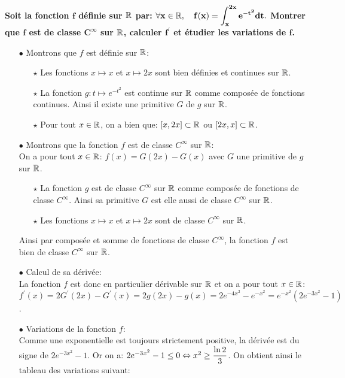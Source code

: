 \documentclass[a4paper, 11pt,reqno]{article}
\begin{document}
\begin{correction}  \;
	\textbf{Soit la fonction $\mathbf{f}$ d\'efinie sur $\mathbf{\mathbb{R}}$ par: $\mathbf{ \displaystyle \forall x\in\mathbb{R},\quad f(x)=\int_x^{2x} e^{-t^2}dt.}$
		Montrer que $\mathbf{f}$ est de classe $\mathbf{C^{\infty}}$ sur $\mathbf{\mathbb{R}}$, calculer $\mathbf{f^{\prime}}$ et \'etudier les variations de $\mathbf{f}$.}
	\begin{itemize}
		\item[$\bullet$] Montrons que $f$ est d\'efinie sur $\mathbb{R}$:
		      \begin{itemize}
			      \item[$\star$] Les fonctions $x\mapsto x$ et $x\mapsto 2x$ sont bien d\'efinies et continues sur $\mathbb{R}$.
			      \item[$\star$] La fonction $g: t\mapsto e^{-t^2}$ est continue sur $\mathbb{R}$ comme compos\'ee de fonctions continues. Ainsi il existe une primitive $G$ de $g$ sur $\mathbb{R}$.
			      \item[$\star$] Pour tout $x\in\mathbb{R}$, on a bien que: $\lbrack x,2x\rbrack\subset \mathbb{R}$ ou $\lbrack 2x,x\rbrack\subset \mathbb{R}$.
		      \end{itemize}
		\item[$\bullet$] Montrons que la fonction $f$ est de classe $C^{\infty}$ sur $\mathbb{R}$:\\
		      \noindent On a pour tout $x\in\mathbb{R}$: $f(x)=G(2x)-G(x)$ avec $G$ une primitive de $g$ sur $\mathbb{R}$.
		      \begin{itemize}
			      \item[$\star$] La fonction $g$ est de classe $C^{\infty}$ sur $\mathbb{R}$ comme compos\'ee de fonctions de classe $C^{\infty}$. Ainsi sa primitive $G$ est elle aussi de classe $C^{\infty}$ sur $\mathbb{R}$.
			      \item[$\star$] Les fonctions $x\mapsto x$ et $x\mapsto 2x$ sont de classe $C^{\infty}$ sur $\mathbb{R}$.
		      \end{itemize}
		      Ainsi par compos\'ee et somme de fonctions de classe $C^{\infty}$, la fonction $f$ est bien de classe $C^{\infty}$ sur $\mathbb{R}$.
		\item[$\bullet$] Calcul de sa d\'eriv\'ee:\\
		      \noindent La fonction $f$ est donc en particulier d\'erivable sur $\mathbb{R}$ et on a pour tout $x\in\mathbb{R}$: $f^{\prime}(x)=2G^{\prime}(2x)-G^{\prime}(x)=2g(2x)-g(x)=2e^{-4x^2}-e^{-x^2}=e^{-x^2}(2e^{-3x^2}-1)$.
		\item[$\bullet$] Variations de la fonction $f$:\\
		      Comme une exponentielle est toujours strictement positive, la d\'eriv\'ee est du signe de $2e^{-3x^2}-1$. Or on a: $2e^{-3x^2}-1\leq 0\Leftrightarrow x^2\geq \displaystyle\frac{\ln{2}}{3}$. On obtient ainsi le tableau des variations suivant:

\end{itemize}
\end{correction}
\end{document}
